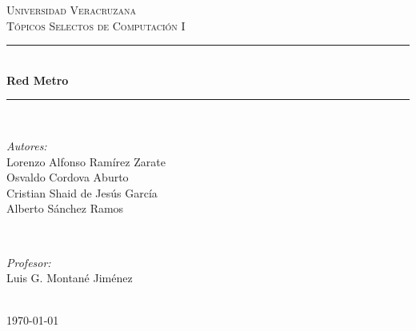 \documentclass[12pt]{article} %
\begin{document}

\begin{titlepage}

\newcommand{\HRule}{\rule{\linewidth}{0.5mm}} %

\center %

\textsc{\LARGE Universidad Veracruzana}\\[1.5cm] %
\textsc{\Large Tópicos Selectos de Computación I}\\[0.5cm] %


\HRule \\[0.4cm]
{ \huge \bfseries Red Metro}\\[0.4cm] %
\HRule \\[1.5cm]

\begin{minipage}{0.4\textwidth}
\begin{flushleft} \large
\emph{Autores:}\\
Lorenzo Alfonso Ramírez Zarate\\
Osvaldo Cordova Aburto\\
Cristian Shaid de Jesús García\\
Alberto Sánchez Ramos %
\end{flushleft}
\end{minipage}
~
\begin{minipage}{0.4\textwidth}
\begin{flushright} \large
\emph{Profesor:} \\
Luis G. Montané Jiménez %
\end{flushright}
\end{minipage}\\[4cm]

{\large \today}\\[3cm] %


\vfill %

\end{titlepage}
\end{document}
